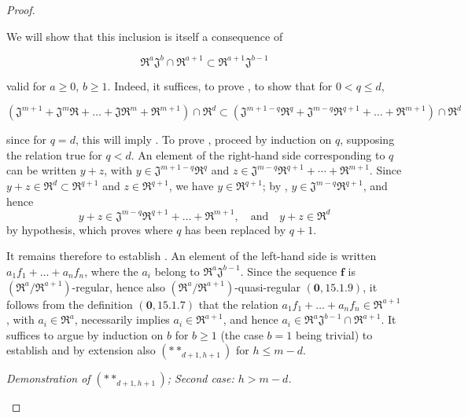 \begin{proof}
\begin{env}[19.7.1.15]
We will show that this inclusion is itself a consequence of
\end{env}
\begin{env}[19.7.1.16]
\label{IV.19.7.1.16}
\[
  \mathfrak{R}^a\mathfrak{J}^b\cap\mathfrak{R}^{a+1}\subset\mathfrak{R}^{a+1}\mathfrak{J}^{b-1}
\]
\end{env}
valid for $a\geqslant 0$, $b\geqslant 1$. Indeed, it suffices, to prove , to show that for $0<q\leqslant d$,
\begin{env}[19.7.1.17]
\label{IV.19.7.1.17}
\[
  (\mathfrak{J}^{m+1}+\mathfrak{J}^m\mathfrak{R}+\ldots+\mathfrak{J}\mathfrak{R}^m+\mathfrak{R}^{m+1})\cap\mathfrak{R}^d\subset(\mathfrak{J}^{m+1-q}\mathfrak{R}^q+\mathfrak{J}^{m-q}\mathfrak{R}^{q+1}+\ldots+\mathfrak{R}^{m+1})\cap\mathfrak{R}^d
\]
\end{env}
since for $q=d$, this will imply . To prove , proceed by induction on $q$, supposing the relation true for $q<d$. An element of the right-hand side corresponding to $q$ can be written $y+z$, with $y\in\mathfrak{J}^{m+1-q}\mathfrak{R}^q$ and $z\in\mathfrak{J}^{m-q}\mathfrak{R}^{q+1}+\cdots+\mathfrak{R}^{m+1}$. Since $y+z\in\mathfrak{R}^d\subset\mathfrak{R}^{q+1}$ and $z\in\mathfrak{R}^{q+1}$, we have $y\in\mathfrak{R}^{q+1}$; by , $y\in\mathfrak{J}^{m-q}\mathfrak{R}^{q+1}$, and hence
\[
  y+z\in\mathfrak{J}^{m-q}\mathfrak{R}^{q+1}+\ldots+\mathfrak{R}^{m+1},\quad\text{and}\quad y+z\in\mathfrak{R}^d
\]
by hypothesis, which proves  where $q$ has been replaced by $q+1$.

It remains therefore to establish . An element of the left-hand side is written $a_1f_1+\ldots+a_nf_n$, where the $a_i$ belong to $\mathfrak{R}^a\mathfrak{J}^{b-1}$. Since the sequence $\mathbf{f}$ is $(\mathfrak{R}^a/\mathfrak{R}^{a+1})$-regular, hence also $(\mathfrak{R}^a/\mathfrak{R}^{a+1})$-quasi-regular $(\mathbf{0},15.1.9)$, it follows from the definition $(\mathbf{0},15.1.7)$ that the relation $a_1f_1+\ldots+a_nf_n\in\mathfrak{R}^{a+1}$, with $a_i\in\mathfrak{R}^a$, necessarily implies $a_i\in\mathfrak{R}^{a+1}$, and hence $a_i\in\mathfrak{R}^a\mathfrak{J}^{b-1}\cap\mathfrak{R}^{a+1}$. It suffices to argue by
induction on $b$ for $b\geqslant 1$ (the case $b=1$ being trivial) to establish  and by extension also $(**_{d+1,h+1})$ for $h\leqslant m-d$.

\begin{env}[19.7.1.18]
\label{IV.19.7.1.18}
\emph{Demonstration of $(**_{d+1,h+1})$; Second case: $h>m-d$.}


\end{env}
\end{proof}
